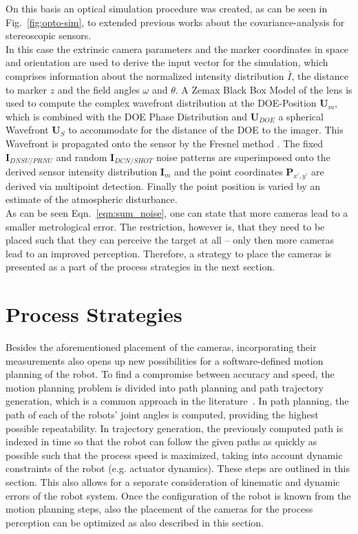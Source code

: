 \documentclass[5p,times,procedia]{elsarticle}
\begin{document}
%
On this basis an optical simulation procedure was created, as can be seen in Fig.~\ref{fig:opto-sim}, to extended previous works \cite{Liu_2021,Di_Leo_2011} about the covariance-analysis for stereoscopic sensors.\\
%
In this case the extrinsic camera parameters and the marker coordinates in space and orientation are used to derive
the input vector for the simulation, which comprises information about the normalized intensity distribution $\bar{I}$, the distance to marker $z$ and the field angles $\omega$ and $\theta$. A Zemax Black Box Model of the lens is used to compute the complex wavefront distribution at the DOE-Position $\mathbf{U}_m$, which is combined with the DOE Phase Distribution and $\mathbf{U}_{DOE}$ a spherical Wavefront $\mathbf{U}_{S}$ to accommodate for the distance of the DOE to the imager. This Wavefront is propagated onto the sensor by the Fresnel method \cite{Goodman2005}. The fixed $\mathbf{I}_{DNSU/PRNU}$ and random $\mathbf{I}_{DCN/SHOT}$ noise patterns are superimposed onto the derived sensor intensity distribution $\mathbf{I}_m$ and the point coordinates $\mathbf{P}_{x’,y’}$ are derived via multipoint detection.
Finally the point position is varied by an estimate of the atmospheric disturbance.\\
%
As can be seen Eqn.~\ref{eqn:sum_noise}, one can state that more cameras lead to a smaller metrological error.
The restriction, however is, that they need to be placed such that they can perceive the target at all -- only then more cameras lead to an improved perception.
Therefore, a strategy to place the cameras is presented as a part of the process strategies in the next section.
%
\section{Process Strategies}
Besides the aforementioned placement of the cameras, incorporating their measurements also opens up new possibilities for a software-defined motion planning of the robot.
To find a compromise between accuracy and speed, the motion planning problem is divided into path planning and path trajectory generation, which is a common approach in the literature~\cite{Choset05}.
In path planning, the path of each of the robots' joint angles is computed, providing the highest possible repeatability.
In trajectory generation, the previously computed path is indexed in time so that the robot can follow the given paths as quickly as possible such that the process speed is maximized, taking into account dynamic constraints of the robot (e.g. actuator dynamics).
These steps are outlined in this section.
This also allows for a separate consideration of kinematic and dynamic errors of the robot system. 
Once the configuration of the robot is known from the motion planning steps, also the placement of the cameras for the process perception can be optimized as also described in this section. 
%
%
\end{document}
